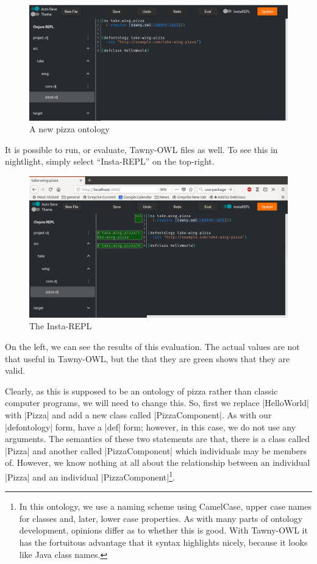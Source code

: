 \begin{figure}
  \centering
  \includegraphics{images/night-pizza.png}
  \caption{A new pizza ontology}
  \label{fig:nightlight-pizza}
\end{figure}

It is possible to run, or evaluate, Tawny-OWL files as well. To see
this in nightlight, simply select ``Insta-REPL'' on the top-right.

\begin{figure}
  \centering
  \includegraphics{images/night-instarepl.png}
  \caption{The Insta-REPL}
  \label{fig:nightlight-pizza}
\end{figure}

On the left, we can see the results of this evaluation. The actual
values are not that useful in Tawny-OWL, but the that they are green
shows that they are valid.

Clearly, as this is supposed to be an ontology of pizza rather than
classic computer programs, we will need to change this. So, first we
replace |HelloWorld| with |Pizza| and add a new class called
|PizzaComponent|.  As with our |defontology| form, have a |def| form;
however, in this case, we do not use any arguments. The semantics of
these two statements are that, there is a class called |Pizza| and
another called |PizzaComponent| which individuals may be members of.
However, we know nothing at all about the relationship between an
individual |Pizza| and an individual |PizzaComponent|\footnote{In this
  ontology, we use a naming scheme using CamelCase, upper case names
  for classes and, later, lower case properties. As with many parts of
  ontology development, opinions differ as to whether this is
  good. With Tawny-OWL it has the fortuitous advantage that it syntax
  highlights nicely, because it looks like Java class names.}.

